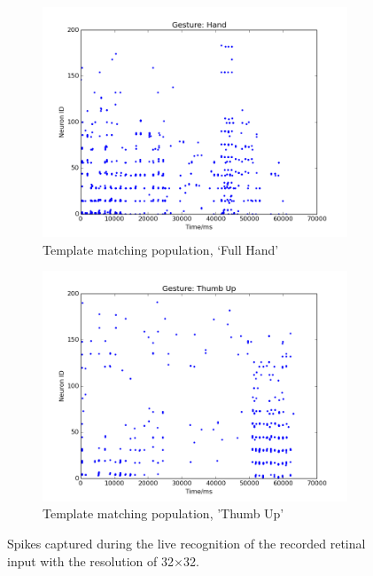 \documentclass[journal]{journal}
\begin{document}
\begin{figure}
\begin{subfigure}[t]{0.24\textwidth}
		\includegraphics[width=\textwidth]{pics/figure_32_4.png}
		\caption{Template matching population, `Full Hand'}
	    \label{fig:rec532}
	\end{subfigure}	
	\begin{subfigure}[t]{0.24\textwidth}
		\includegraphics[width=\textwidth]{pics/figure_32_5.png}
		\caption{Template matching population, 'Thumb Up'}
	    \label{fig:rect32}
	\end{subfigure}	
\caption{Spikes captured during the live recognition of the recorded retinal input with the resolution of 32$\times$32. }
\label{fig:rps32}
\end{figure}
\end{document}
